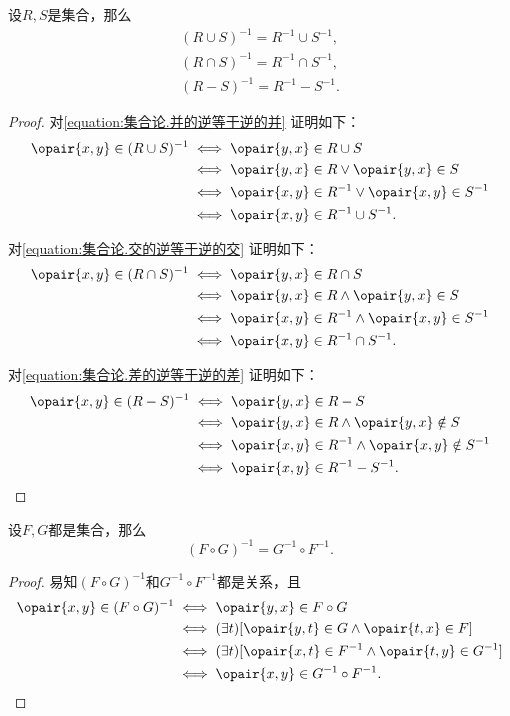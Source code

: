 \begin{theorem}
设\(R,S\)是集合，那么\begin{gather}
	(R \cup S)^{-1} = R^{-1} \cup S^{-1},
	\label{equation:集合论.并的逆等于逆的并} \\
	(R \cap S)^{-1} = R^{-1} \cap S^{-1},
	\label{equation:集合论.交的逆等于逆的交} \\
	(R - S)^{-1} = R^{-1} - S^{-1}.
	\label{equation:集合论.差的逆等于逆的差}
\end{gather}
\begin{proof}
对\cref{equation:集合论.并的逆等于逆的并} 证明如下：
\begin{align*}
	\opair{x,y} \in (R \cup S)^{-1}
	&\iff \opair{y,x} \in R \cup S \\
	&\iff \opair{y,x} \in R \lor \opair{y,x} \in S \\
	&\iff \opair{x,y} \in R^{-1} \lor \opair{x,y} \in S^{-1} \\
	&\iff \opair{x,y} \in R^{-1} \cup S^{-1}.
\end{align*}

对\cref{equation:集合论.交的逆等于逆的交} 证明如下：
\begin{align*}
	\opair{x,y} \in (R \cap S)^{-1}
	&\iff \opair{y,x} \in R \cap S \\
	&\iff \opair{y,x} \in R \land \opair{y,x} \in S \\
	&\iff \opair{x,y} \in R^{-1} \land \opair{x,y} \in S^{-1} \\
	&\iff \opair{x,y} \in R^{-1} \cap S^{-1}.
\end{align*}

对\cref{equation:集合论.差的逆等于逆的差} 证明如下：
\begin{align*}
	\opair{x,y} \in (R - S)^{-1}
	&\iff \opair{y,x} \in R - S \\
	&\iff \opair{y,x} \in R \land \opair{y,x} \notin S \\
	&\iff \opair{x,y} \in R^{-1} \land \opair{x,y} \notin S^{-1} \\
	&\iff \opair{x,y} \in R^{-1} - S^{-1}.
	\qedhere
\end{align*}
\end{proof}
\end{theorem}

\begin{theorem}
设\(F,G\)都是集合，那么\[
	(F \circ G)^{-1} = G^{-1} \circ F^{-1}.
\]
\begin{proof}
易知\((F \circ G)^{-1}\)和\(G^{-1} \circ F^{-1}\)都是关系，且\begin{align*}
	\opair{x,y} \in (F \circ G)^{-1}
	&\iff
	\opair{y,x} \in F \circ G \\
	&\iff
	(\exists t)[\opair{y,t} \in G \land \opair{t,x} \in F] \\
	&\iff
	(\exists t)[\opair{x,t} \in F^{-1} \land \opair{t,y} \in G^{-1}] \\
	&\iff
	\opair{x,y} \in G^{-1} \circ F^{-1}.
	\qedhere
\end{align*}
\end{proof}
\end{theorem}


